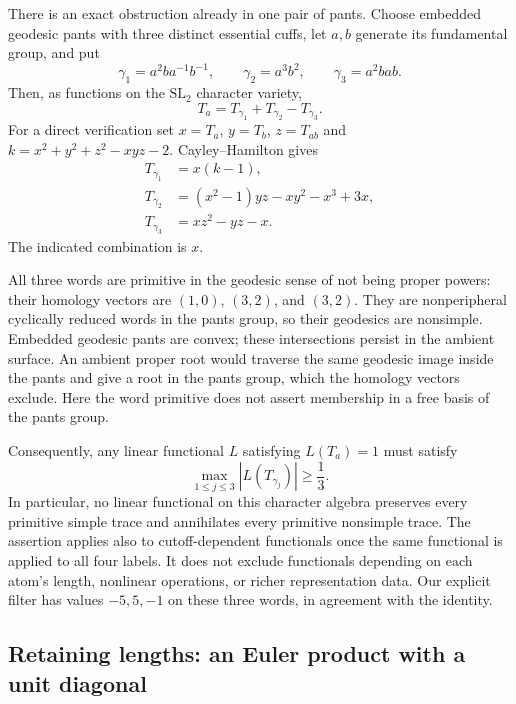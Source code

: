 There is an exact obstruction already in one pair of pants.
Choose embedded geodesic pants with three distinct essential cuffs,
let $a,b$ generate its fundamental group, and put
\[
 \gamma_1=a^2ba^{-1}b^{-1},\qquad
 \gamma_2=a^3b^2,\qquad
 \gamma_3=a^2bab.
\]
Then, as functions on the $\mathrm{SL}_2$ character variety,
\begin{equation}
 \boxed{T_a=T_{\gamma_1}+T_{\gamma_2}-T_{\gamma_3}.}
 \label{eq:globalobstruction}
\end{equation}
For a direct verification set $x=T_a$, $y=T_b$, $z=T_{ab}$ and
$k=x^2+y^2+z^2-xyz-2$. Cayley--Hamilton gives
\begin{align*}
 T_{\gamma_1}&=x(k-1),\\
 T_{\gamma_2}&=(x^2-1)yz-xy^2-x^3+3x,\\
 T_{\gamma_3}&=xz^2-yz-x.
\end{align*}
The indicated combination is $x$.

All three words are primitive in the geodesic sense of not being
proper powers: their homology vectors are $(1,0)$, $(3,2)$, and
$(3,2)$. They are nonperipheral cyclically reduced words in the
pants group, so their geodesics are nonsimple. Embedded geodesic
pants are convex; these intersections persist in the ambient
surface. An ambient proper root would traverse the same geodesic
image inside the pants and give a root in the pants group, which
the homology vectors exclude. Here the word primitive does not assert membership in a
free basis of the pants group.

Consequently, any linear functional $L$ satisfying $L(T_a)=1$
must satisfy
\begin{equation}
 \max_{1\leq j\leq3}|L(T_{\gamma_j})|\geq\frac13.
 \label{eq:globalobstructionbound}
\end{equation}
In particular, no linear functional on this character algebra
preserves every primitive simple trace and annihilates every
primitive nonsimple trace. The assertion applies also to
cutoff-dependent functionals once the same functional is applied
to all four labels. It does not exclude functionals depending
on each atom's length, nonlinear operations, or richer
representation data. Our explicit filter has values $-5,5,-1$
on these three words, in agreement with the identity.

\subsection{Retaining lengths: an Euler product with a unit diagonal}


